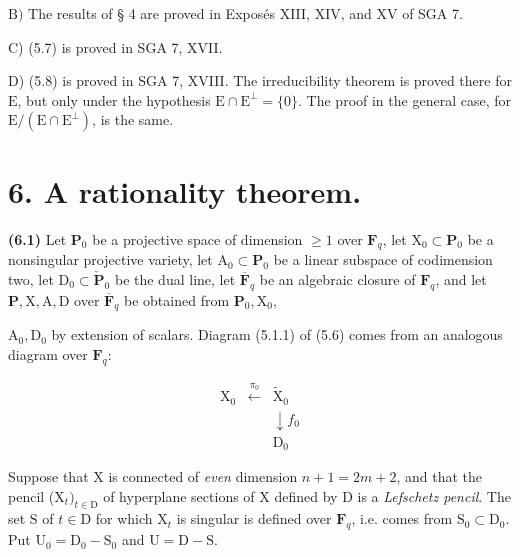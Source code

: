 \documentclass[10pt,leqno]{article}
\begin{document}
\noindent \(\mathrm{B})\) The results of § 4 are proved in Exposés XIII, XIV, and XV of SGA 7.\par

\noindent C) (5.7) is proved in SGA 7, XVII.\par

\noindent D) (5.8) is proved in SGA 7, XVIII. The irreducibility theorem is proved there for \(\mathrm{E}\), but only under the hypothesis \(\mathrm{E}\cap \mathrm{E}^{\perp }=\{0\}\). The proof in the general case, for \(\mathrm{E}/(\mathrm{E}\cap \mathrm{E}^{\perp })\), is the same.\par

\section*{6. A rationality theorem.}

\noindent \textbf{(6.1)} Let \(\mathbf{P}_{0}\) be a projective space of dimension \(\geq 1\) over \(\mathbf{F}_{q}\), let \(\mathrm{X}_{0}\subset \mathbf{P}_{0}\) be a nonsingular projective variety, let \(\mathrm{A}_{0}\subset \mathbf{P}_{0}\) be a linear subspace of codimension two, let \(\mathrm{D}_{0}\subset \check{\mathbf{P}}_{0}\) be the dual line, let \(\overline{\mathbf{F}}_{q}\) be an algebraic closure of \(\mathbf{F}_{q}\), and let \(\mathbf{P}, \mathrm{X}, \mathrm{A}, \mathrm{D}\) over \(\overline{\mathbf{F}}_{q}\) be obtained from \(\mathbf{P}_{0}, \mathrm{X}_{0}\),\par

\clearpage

\label{physical-24}\par\smallskip

\noindent \(\mathrm{A}_{0}, \mathrm{D}_{0}\) by extension of scalars. Diagram (5.1.1) of (5.6) comes from an analogous diagram over \(\mathbf{F}_{q}\):\par

\[\begin{array}{ccc}\mathrm X_0&\xleftarrow{\pi_0}&\widetilde{\mathrm X}_0\\ &&\downarrow\!{f_0}\\ &&\mathrm D_0\end{array}\tag{6.1.1}\]

\noindent Suppose that \(\mathrm{X}\) is connected of \emph{even} dimension \(n+1=2m+2\), and that the pencil (\(\mathrm{X}_{t})_{t\in \mathrm{D}}\) of hyperplane sections of \(\mathrm{X}\) defined by \(\mathrm{D}\) is a \emph{Lefschetz pencil}. The set \(\mathrm{S}\) of \(t\in \mathrm{D}\) for which \(\mathrm{X}_{t}\) is singular is defined over \(\mathbf{F}_{q}\), i.e. comes from \(\mathrm{S}_{0}\subset \mathrm{D}_{0}\). Put \(\mathrm{U}_{0}=\mathrm{D}_{0}- \mathrm{S}_{0}\) and \(\mathrm{U}=\mathrm{D}- \mathrm{S}\).\par
\end{document}

